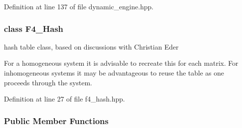 Definition at line 137 of file dynamic\+\_\+engine.\+hpp.

\label{class_f4___hash}
\subsubsection{class F4\+\_\+\+Hash}
hash table class, based on discussions with Christian Eder 

For a homogeneous system it is advisable to recreate this for each matrix. For inhomogeneous systems it may be advantageous to reuse the table as one proceeds through the system. 

Definition at line 27 of file f4\+\_\+hash.\+hpp.

\subsubsection*{Public Member Functions}

